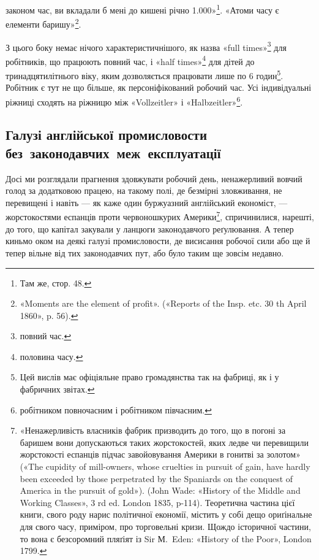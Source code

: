 \parcont{}  %
законом час, ви вкладали б мені до кишені річно \num{1.000}»\footnote{
Там же, стор. 48.
}. «Атоми часу є елементи баришу»\footnote{
«Moments are the element of profit». («Reports of the Insp. etc.
30 th April 1860», p. 56).
}.

З цього боку немає нічого характеристичнішого, як назва
«\textenglish{full times}»\footnote*{
повний час. 
} для робітників, що працюють повний час, і «half
times»\footnote*{
половина часу. 
} для дітей до тринадцятилітнього віку, яким дозволяється
працювати лише по 6 годин\footnote{
Цей вислів має офіціяльне право громадянства так на фабриці,
як і у фабричних звітах.
}. Робітник є тут не що більше,
як персоніфікований робочий час. Усі індивідуальні ріжниці
сходять на ріжницю між «Vollzeitler» і «Halbzeitler»\footnote*{
робітником повночасним і робітником півчасним. 
}.

\subsection[Галузі англійської промисловости \\
без~законодавчих~меж~експлуатації]{%
Галузі англійської промисловости
без~законодавчих~меж~експлуатації}

Досі ми розглядали прагнення здовжувати робочий день,
ненажерливий вовчий голод за додатковою працею, на такому
полі, де безмірні зловживання, не перевищені і навіть — як каже
один буржуазний англійський економіст, — жорстокостями еспанців
проти червоношкурих Америки\footnote{
«Ненажерливість власників фабрик призводить до того, що в погоні
за баришем вони допускаються таких жорстокостей, яких ледве чи
перевищили жорстокості еспанців підчас завойовування Америки в гонитві
за золотом» («The cupidity of mill-owners, whose cruelties in pursuit
of gain, have hardly been exceeded by those perpetrated by the Spaniards
on the conquest of America in the pursuit of gold»). (John Wade:
«History of the Middle and Working Classes», 3 rd ed. London 1835, p-114).
Теоретична частина цієї книги, свого роду нарис політичної економії,
містить у собі дещо ориґінальне для свого часу, приміром, про торговельні
кризи. Щождо історичної частини, то вона є безсоромний пляґіят із Sir
М.~Eden: «History of the Poor», London 1799.
}, спричинилися, нарешті,
до того, що капітал закували у ланцюги законодавчого реґулювання.
А тепер киньмо оком на деякі галузі промисловости, де
висисання робочої сили або ще й тепер вільне від тих законодавчих
пут, або було таким ще зовсім недавно.

